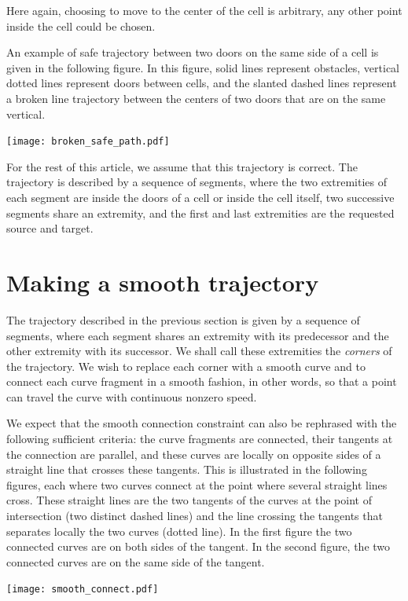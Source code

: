 \documentclass{llncs}
\begin{document}
Here again, choosing to move to the center of the cell is arbitrary,
any other point inside the cell could be chosen.

An example of safe trajectory between two doors on the same side of a cell is
given in the following figure.  In this figure, solid lines represent
obstacles, vertical dotted lines represent doors between cells, and
the slanted dashed lines represent a broken line trajectory between
the centers of two doors that are on the same vertical.
\begin{center}
\texttt{[image: broken\_safe\_path.pdf]}
\end{center}

For the rest of this article, we assume that this trajectory is
correct.  The trajectory is described by a sequence of segments, where
the two extremities of each segment are inside the doors of a cell or
inside the cell itself, two successive segments share an extremity,
and the first and last extremities are the requested source and target.

\section{Making a smooth trajectory}
The trajectory described in the previous section is given by a
sequence of segments, where each segment shares an extremity with its
predecessor and the other extremity with its successor.  We shall call
these extremities the {\em corners} of the trajectory.  We wish to
replace each corner with a smooth curve and to connect each curve fragment in
a smooth fashion, in other words, so that a point can travel the curve with
continuous nonzero speed.

We expect that the smooth connection constraint can also be rephrased
with the following sufficient criteria: the curve fragments are connected,
their tangents at the connection are parallel, and these curves are
locally on opposite sides of a straight line that crosses these
tangents.  This is illustrated in the following figures, each where
two curves connect at the point where several straight lines cross.
These straight lines are the two tangents of the curves at the point of
intersection (two distinct dashed lines) and the line crossing the
tangents that separates locally the two curves (dotted line).  In the
first figure the two connected curves are on both sides of the tangent.
In the second figure, the two connected curves are on the same side of the
tangent.

\begin{center}
\texttt{[image: smooth\_connect.pdf]}
\end{center}
\end{document}
